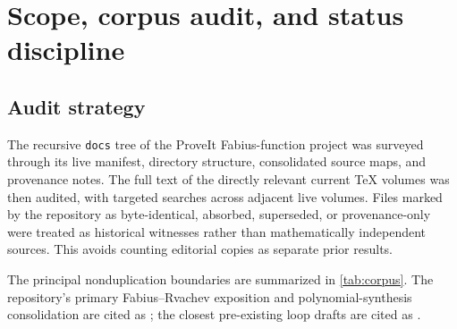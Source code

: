 \documentclass[11pt,oneside]{article}
\numberwithin{equation}{section}
\theoremstyle{definition}
\theoremstyle{remark}
\begin{document}
\tableofcontents
\newpage

\section{Scope, corpus audit, and status discipline}
\label{sec:scope}

\subsection{Audit strategy}

The recursive \texttt{docs} tree of the ProveIt Fabius-function project was
surveyed through its live manifest, directory structure, consolidated source
maps, and provenance notes.  The full text of the directly relevant current
TeX volumes was then audited, with targeted searches across adjacent live
volumes.  Files marked by the repository as byte-identical, absorbed,
superseded, or provenance-only were treated as historical witnesses rather
than mathematically independent sources.  This avoids counting editorial
copies as separate prior results.

The principal nonduplication boundaries are summarized in
\cref{tab:corpus}.  The repository's primary Fabius--Rvachev exposition and
polynomial-synthesis consolidation are cited as
\cite{ReshetnikovPrimary,ReshetnikovSynthesis}; the closest pre-existing loop
drafts are cited as \cite{ReshetnikovLoopV3,ReshetnikovLoopV4}.
\end{document}
